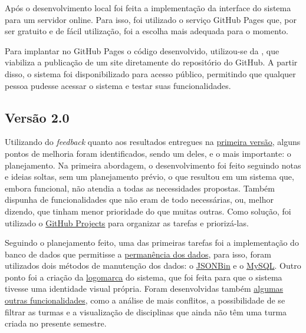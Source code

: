 Após o desenvolvimento local foi feita a implementação da interface do sistema para um servidor online. Para isso, foi utilizado o serviço GitHub Pages que, por ser gratuito e de fácil utilização, foi a escolha mais adequada para o momento.

Para implantar no GitHub Pages o código desenvolvido, utilizou-se da , que viabiliza a publicação de um site diretamente do repositório do GitHub. A partir disso, o sistema foi disponibilizado para acesso público, permitindo que qualquer pessoa pudesse acessar o sistema e testar suas funcionalidades.

\subsection{Versão 2.0} \label{ssec:MVP2} %

Utilizando do \textit{feedback} quanto aos resultados entregues na \hyperref[ssec:MVP1]{primeira versão}, alguns pontos de melhoria foram identificados, sendo um deles, e o mais importante: o planejamento. Na primeira abordagem, o desenvolvimento foi feito seguindo notas e ideias soltas, sem um planejamento prévio, o que resultou em um sistema que, embora funcional, não atendia a todas as necessidades propostas. Também dispunha de funcionalidades que não eram de todo necessárias, ou, melhor dizendo, que tinham menor prioridade do que muitas outras. Como solução, foi utilizado o \hyperref[sssec:GitHub Projects]{GitHub Projects} para organizar as tarefas e priorizá-las.



Seguindo o planejamento feito, uma das primeiras tarefas foi a implementação do banco de dados que permitisse a \hyperref[sssec:Permanência dos Dados]{permanência dos dados}, para isso, foram utilizados dois métodos de manutenção dos dados: o \hyperref[ssssec:JSONBin]{JSONBin} e o \hyperref[ssssec:MySQL]{MySQL}. Outro ponto foi a criação da \hyperref[sssec:Logomarca]{logomarca} do sistema, que foi feita para que o sistema tivesse uma identidade visual própria. Foram desenvolvidas também \hyperref[sssec:Funcionalidades Adicionais]{algumas outras funcionalidades}, como a análise de mais conflitos, a possibilidade de se filtrar as turmas e a visualização de disciplinas que ainda não têm uma turma criada no presente semestre.


